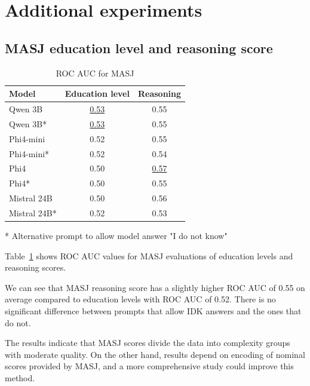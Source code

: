 \section{Additional experiments}
\label{sec:additional_experiments}


\subsection{MASJ education level and reasoning score}
\label{sec:masj_evaluation}

\begin{table}[t]
\centering
\begin{tabular}{l c c}
\hline
Model & Education level & Reasoning \\
\hline
Qwen 3B & \underline{0.53} & 0.55 \\
Qwen 3B* & \underline{0.53} & 0.55 \\
Phi4-mini & 0.52 & 0.55 \\
Phi4-mini* & 0.52 & 0.54 \\
Phi4 & 0.50 & \underline{0.57} \\
Phi4* & 0.50 & 0.55 \\
Mistral 24B & 0.50 & 0.56 \\
Mistral 24B* & 0.52 & 0.53 \\
\hline
\end{tabular}
\caption{ROC AUC for MASJ}
\label{tab:roc_auc_masj}
\footnotesize{* Alternative prompt to allow model answer "I do not know"}\\
\end{table}

Table~\ref{tab:roc_auc_masj} shows ROC AUC values for MASJ evaluations of education levels and reasoning scores.

We can see that MASJ reasoning score has a slightly higher ROC AUC of 0.55 on average compared to education levels with ROC AUC of 0.52. There is no significant difference between prompts that allow IDK answers and the ones that do not. 

The results indicate that MASJ scores divide the data into complexity groups with moderate quality. On the other hand, results depend on encoding of nominal scores provided by MASJ, and a more comprehensive study could improve this method.

